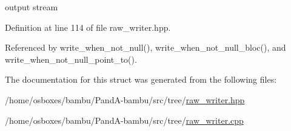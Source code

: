 output stream 

Definition at line 114 of file raw\+\_\+writer.\+hpp.



Referenced by write\+\_\+when\+\_\+not\+\_\+null(), write\+\_\+when\+\_\+not\+\_\+null\+\_\+bloc(), and write\+\_\+when\+\_\+not\+\_\+null\+\_\+point\+\_\+to().



The documentation for this struct was generated from the following files\+:\begin{DoxyCompactItemize}
\item 
/home/osboxes/bambu/\+Pand\+A-\/bambu/src/tree/\hyperlink{raw__writer_8hpp}{raw\+\_\+writer.\+hpp}\item 
/home/osboxes/bambu/\+Pand\+A-\/bambu/src/tree/\hyperlink{raw__writer_8cpp}{raw\+\_\+writer.\+cpp}\end{DoxyCompactItemize}
